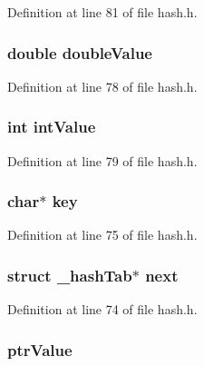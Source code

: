 Definition at line 81 of file hash.\-h.

\hypertarget{struct__hash_tab_a7bc845542bdc79ff87d50b7c40a069f2}{
\subsubsection[{double\-Value}]{\setlength{\rightskip}{0pt plus 5cm}double double\-Value}}\label{struct__hash_tab_a7bc845542bdc79ff87d50b7c40a069f2}


Definition at line 78 of file hash.\-h.

\hypertarget{struct__hash_tab_a23b7c31b2f6c188e1c281f7be7473f23}{
\subsubsection[{int\-Value}]{\setlength{\rightskip}{0pt plus 5cm}int int\-Value}}\label{struct__hash_tab_a23b7c31b2f6c188e1c281f7be7473f23}


Definition at line 79 of file hash.\-h.

\hypertarget{struct__hash_tab_a5892a9181e6a332f84d27aecd41dcd12}{
\subsubsection[{key}]{\setlength{\rightskip}{0pt plus 5cm}char$\ast$ key}}\label{struct__hash_tab_a5892a9181e6a332f84d27aecd41dcd12}


Definition at line 75 of file hash.\-h.

\hypertarget{struct__hash_tab_a6b1bf82fb36b767517ec28950b8f888d}{
\subsubsection[{next}]{\setlength{\rightskip}{0pt plus 5cm}struct {\bf \-\_\-hash\-Tab}$\ast$ next}}\label{struct__hash_tab_a6b1bf82fb36b767517ec28950b8f888d}


Definition at line 74 of file hash.\-h.

\hypertarget{struct__hash_tab_a59393e473d6eccef47ff04cc0928f74e}{
\subsubsection[{ptr\-Value}]{ ptr\-Value}}\label{struct__hash_tab_a59393e473d6eccef47ff04cc0928f74e}


